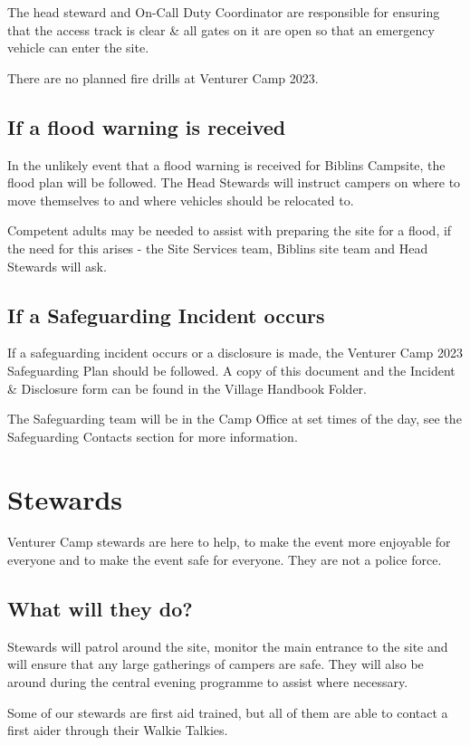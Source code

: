 \documentclass[a4paper, 11pt]{report}
\begin{document}
The head steward and On-Call Duty Coordinator are responsible for ensuring that the access track is clear \& all gates on it are open so that an emergency vehicle can enter the site.\nl

There are no planned fire drills at Venturer Camp 2023.

\section{If a flood warning is received}
In the unlikely event that a flood warning is received for Biblins Campsite, the flood plan will be followed. The Head Stewards will instruct campers on where to move themselves to and where vehicles should be relocated to.\nl

Competent adults may be needed to assist with preparing the site for a flood, if the need for this arises - the Site Services team, Biblins site team and Head Stewards will ask. 

\section{If a Safeguarding Incident occurs}
If a safeguarding incident occurs or a disclosure is made, the Venturer Camp 2023 Safeguarding Plan should be followed. A copy of this document and the Incident \& Disclosure form can be found in the Village Handbook Folder.\nl

The Safeguarding team will be in the Camp Office at set times of the day, see the Safeguarding Contacts section for more information.

\chapter{Stewards}
Venturer Camp stewards are here to help, to make the event more enjoyable for everyone and to make the event safe for everyone. They are not a police force.
\section{What will they do?}
Stewards will patrol around the site, monitor the main entrance to the site and will ensure that any large gatherings of campers are safe. They will also be around during the central evening programme to assist where necessary.\nl

Some of our stewards are first aid trained, but all of them are able to contact a first aider through their Walkie Talkies. \nl
\end{document}
